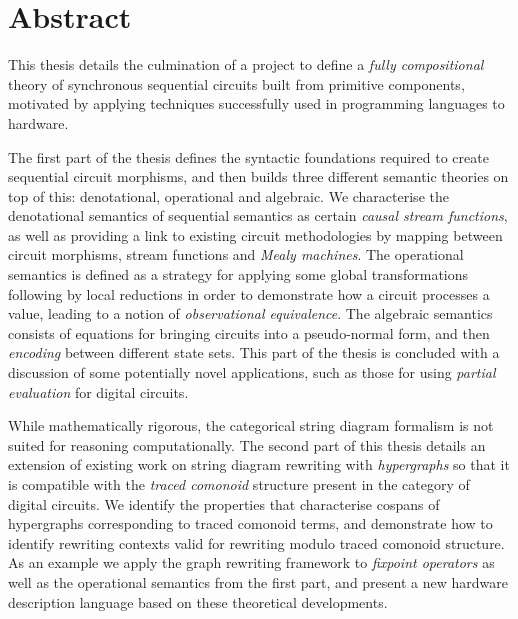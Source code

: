 \chapter{Abstract}

This thesis details the culmination of a project to define a
\emph{fully compositional} theory of synchronous sequential circuits built from
primitive components, motivated by applying techniques successfully used in
programming languages to hardware.

The first part of the thesis defines the syntactic foundations required to
create sequential circuit morphisms, and then builds three different semantic
theories on top of this: denotational, operational and algebraic.
We characterise the denotational semantics of sequential semantics as certain
\emph{causal stream functions}, as well as providing a link to existing circuit
methodologies by mapping between circuit morphisms, stream functions and
\emph{Mealy machines}.
The operational semantics is defined as a strategy for applying some global
transformations following by local reductions in order to demonstrate how a
circuit processes a value, leading to a notion of
\emph{observational equivalence}.
The algebraic semantics consists of equations for bringing circuits into
a pseudo-normal form, and then \emph{encoding} between different state sets.
This part of the thesis is concluded with a discussion of some potentially
novel applications, such as those for using \emph{partial evaluation} for
digital circuits.

While mathematically rigorous, the categorical string diagram formalism is not
suited for reasoning computationally.
The second part of this thesis details an extension of existing work on string
diagram rewriting with \emph{hypergraphs} so that it is compatible with the
\emph{traced comonoid} structure present in the category of digital circuits.
We identify the properties that characterise cospans of hypergraphs
corresponding to traced comonoid terms, and demonstrate how to identify
rewriting contexts valid for rewriting modulo traced comonoid structure.
As an example we apply the graph rewriting framework to
\emph{fixpoint operators} as well as the operational semantics from the first
part, and present a new hardware description language based on these theoretical
developments.